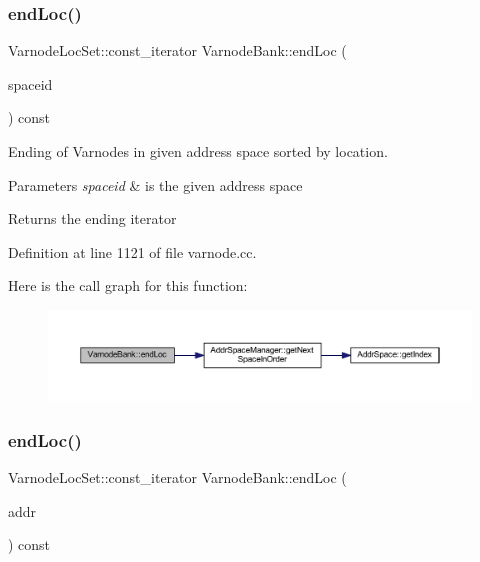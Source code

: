 \subsubsection{\texorpdfstring{endLoc()}{endLoc()}\hspace{0.1cm}{\footnotesize\ttfamily [2/6]}}
{\footnotesize\ttfamily Varnode\+Loc\+Set\+::const\+\_\+iterator Varnode\+Bank\+::end\+Loc (\begin{DoxyParamCaption}\item[{\mbox{\hyperlink{class_addr_space}{Addr\+Space}} $\ast$}]{spaceid }\end{DoxyParamCaption}) const}



Ending of Varnodes in given address space sorted by location. 


\begin{DoxyParams}{Parameters}
{\em spaceid} & is the given address space \\
\hline
\end{DoxyParams}
\begin{DoxyReturn}{Returns}
the ending iterator 
\end{DoxyReturn}


Definition at line 1121 of file varnode.\+cc.

Here is the call graph for this function\+:
\nopagebreak
\begin{figure}[H]
\begin{center}
\leavevmode
\includegraphics[width=350pt]{class_varnode_bank_abdbae6976cda0615c7bf24026bac0d67_cgraph}
\end{center}
\end{figure}
\mbox{\label{class_varnode_bank_ad4f1a373644dccfa63af8cdd56753afd}} 
\subsubsection{\texorpdfstring{endLoc()}{endLoc()}\hspace{0.1cm}{\footnotesize\ttfamily [3/6]}}
{\footnotesize\ttfamily Varnode\+Loc\+Set\+::const\+\_\+iterator Varnode\+Bank\+::end\+Loc (\begin{DoxyParamCaption}\item[{const \mbox{\hyperlink{class_address}{Address}} \&}]{addr }\end{DoxyParamCaption}) const}



